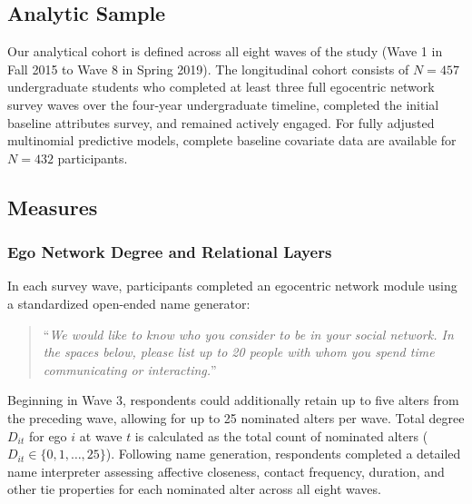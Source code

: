 \documentclass[12pt]{article}
\begin{document}
\subsection{Analytic Sample}

Our analytical cohort is defined across all eight waves of the study (Wave 1 in Fall 2015 to Wave 8 in Spring 2019). The longitudinal cohort consists of $N = 457$ undergraduate students who completed at least three full egocentric network survey waves over the four-year undergraduate timeline, completed the initial baseline attributes survey, and remained actively engaged. For fully adjusted multinomial predictive models, complete baseline covariate data are available for $N = 432$ participants.

\subsection{Measures}

\subsubsection{Ego Network Degree and Relational Layers}

In each survey wave, participants completed an egocentric network module using a standardized open-ended name generator:
\begin{quote}
``\textit{We would like to know who you consider to be in your social network. In the spaces below, please list up to 20 people with whom you spend time communicating or interacting.}''
\end{quote}
Beginning in Wave 3, respondents could additionally retain up to five alters from the preceding wave, allowing for up to 25 nominated alters per wave. Total degree $D_{it}$ for ego $i$ at wave $t$ is calculated as the total count of nominated alters ($D_{it} \in \{0, 1, \dots, 25\}$). Following name generation, respondents completed a detailed name interpreter assessing affective closeness, contact frequency, duration, and other tie properties for each nominated alter across all eight waves. 
\end{document}

